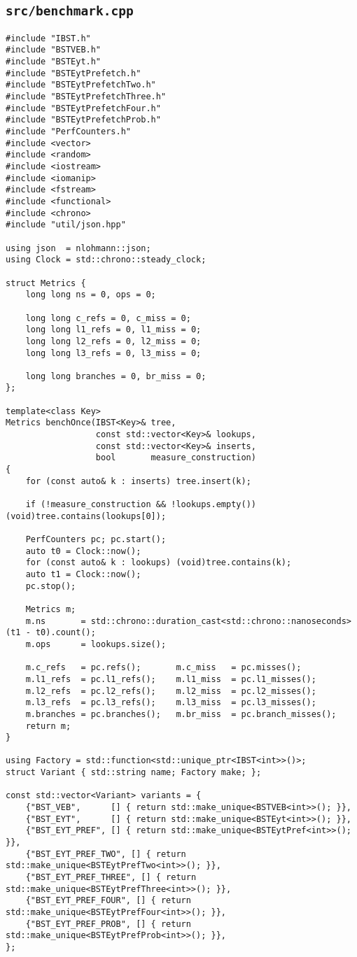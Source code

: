 \subsection{\texttt{src/benchmark.cpp}}
\label{secsec:src-benchmark-cpp}
\begin{lstlisting}
#include "IBST.h"
#include "BSTVEB.h"
#include "BSTEyt.h"
#include "BSTEytPrefetch.h"
#include "BSTEytPrefetchTwo.h"
#include "BSTEytPrefetchThree.h"
#include "BSTEytPrefetchFour.h"
#include "BSTEytPrefetchProb.h"
#include "PerfCounters.h"
#include <vector>
#include <random>
#include <iostream>
#include <iomanip>
#include <fstream>
#include <functional>
#include <chrono>
#include "util/json.hpp"

using json  = nlohmann::json;
using Clock = std::chrono::steady_clock;

struct Metrics {
    long long ns = 0, ops = 0;

    long long c_refs = 0, c_miss = 0;
    long long l1_refs = 0, l1_miss = 0;
    long long l2_refs = 0, l2_miss = 0;
    long long l3_refs = 0, l3_miss = 0;

    long long branches = 0, br_miss = 0;
};

template<class Key>
Metrics benchOnce(IBST<Key>& tree,
                  const std::vector<Key>& lookups,
                  const std::vector<Key>& inserts,
                  bool       measure_construction)
{
    for (const auto& k : inserts) tree.insert(k);

    if (!measure_construction && !lookups.empty()) (void)tree.contains(lookups[0]);

    PerfCounters pc; pc.start();
    auto t0 = Clock::now();
    for (const auto& k : lookups) (void)tree.contains(k);
    auto t1 = Clock::now();
    pc.stop();

    Metrics m;
    m.ns       = std::chrono::duration_cast<std::chrono::nanoseconds>(t1 - t0).count();
    m.ops      = lookups.size();

    m.c_refs   = pc.refs();       m.c_miss   = pc.misses();
    m.l1_refs  = pc.l1_refs();    m.l1_miss  = pc.l1_misses();
    m.l2_refs  = pc.l2_refs();    m.l2_miss  = pc.l2_misses();
    m.l3_refs  = pc.l3_refs();    m.l3_miss  = pc.l3_misses();
    m.branches = pc.branches();   m.br_miss  = pc.branch_misses();
    return m;
}

using Factory = std::function<std::unique_ptr<IBST<int>>()>;
struct Variant { std::string name; Factory make; };

const std::vector<Variant> variants = {
    {"BST_VEB",      [] { return std::make_unique<BSTVEB<int>>(); }},
    {"BST_EYT",      [] { return std::make_unique<BSTEyt<int>>(); }},
    {"BST_EYT_PREF", [] { return std::make_unique<BSTEytPref<int>>(); }},
    {"BST_EYT_PREF_TWO", [] { return std::make_unique<BSTEytPrefTwo<int>>(); }},
    {"BST_EYT_PREF_THREE", [] { return std::make_unique<BSTEytPrefThree<int>>(); }},
    {"BST_EYT_PREF_FOUR", [] { return std::make_unique<BSTEytPrefFour<int>>(); }},
    {"BST_EYT_PREF_PROB", [] { return std::make_unique<BSTEytPrefProb<int>>(); }},
};


\end{lstlisting}
